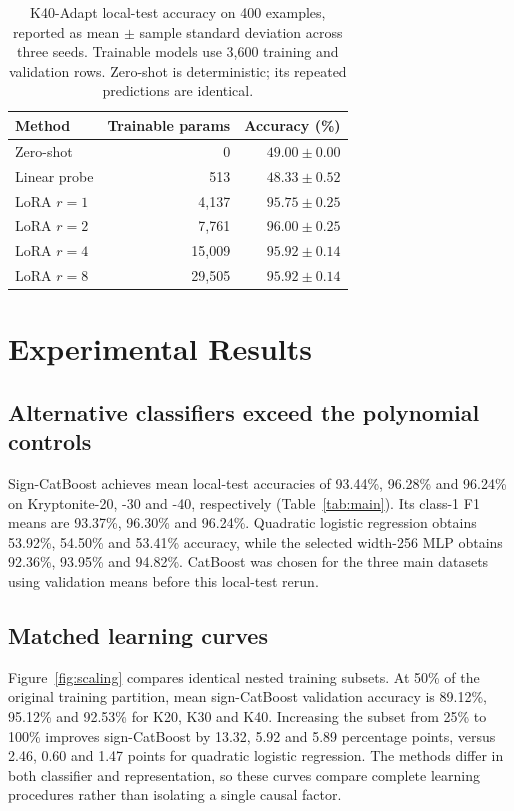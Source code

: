 \documentclass{article}
\begin{document}
\begin{table}[t]
\centering
\caption{K40-Adapt local-test accuracy on 400 examples, reported as mean $\pm$ sample standard deviation across three seeds. Trainable models use 3,600 training and validation rows. Zero-shot is deterministic; its repeated predictions are identical.}
\begin{tabular}{lrr}\toprule
Method & Trainable params & Accuracy (\%) \\\midrule
Zero-shot & 0 & $49.00 \pm 0.00$ \\
Linear probe & 513 & $48.33 \pm 0.52$ \\
LoRA $r=1$ & 4,137 & $95.75 \pm 0.25$ \\
LoRA $r=2$ & 7,761 & $96.00 \pm 0.25$ \\
LoRA $r=4$ & 15,009 & $95.92 \pm 0.14$ \\
LoRA $r=8$ & 29,505 & $95.92 \pm 0.14$ \\
\bottomrule
\end{tabular}
\label{tab:adapt}
\end{table}

\section{Experimental Results}
\subsection{Alternative classifiers exceed the polynomial controls}
Sign-CatBoost achieves mean local-test accuracies of 93.44\%, 96.28\% and 96.24\% on Kryptonite-20, -30 and -40, respectively (Table~\ref{tab:main}). Its class-1 F1 means are 93.37\%, 96.30\% and 96.24\%. Quadratic logistic regression obtains 53.92\%, 54.50\% and 53.41\% accuracy, while the selected width-256 MLP obtains 92.36\%, 93.95\% and 94.82\%. CatBoost was chosen for the three main datasets using validation means before this local-test rerun.

\subsection{Matched learning curves}
Figure~\ref{fig:scaling} compares identical nested training subsets. At 50\% of the original training partition, mean sign-CatBoost validation accuracy is 89.12\%, 95.12\% and 92.53\% for K20, K30 and K40. Increasing the subset from 25\% to 100\% improves sign-CatBoost by 13.32, 5.92 and 5.89 percentage points, versus 2.46, 0.60 and 1.47 points for quadratic logistic regression. The methods differ in both classifier and representation, so these curves compare complete learning procedures rather than isolating a single causal factor.
\end{document}
